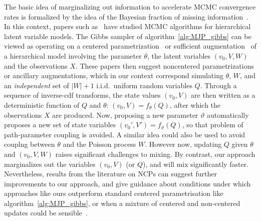 The basic idea of marginalizing out information to accelerate MCMC convergence rates is formalized by the idea of the Bayesian fraction of missing information~\citep{liu1994fraction}. 
In this context, papers such as~\citet{papaspiliopoulos2007general,yu2011center} have studied MCMC algorithms for hierarchical latent variable models. 
The Gibbs sampler of algorithm~\ref{alg:MJP_gibbs} can be viewed as operating on a centered parametrization~\citep{papaspiliopoulos2007general} or sufficient augmentation~\citep{yu2011center} of a hierarchical model involving the parameter $\theta$, the latent variables $(v_0, V, W)$ and the observations $X$. 
These papers then suggest noncentered parametrizations or ancillary augmentations, which in our context correspond simulating $\theta$, $W$, and an {\em independent} set of $|W|+1$ i.i.d.\ uniform random variables $Q$. 
Through a sequence of inverse-cdf transforms, the state values $(v_0,V)$ are then written as a deterministic function of $Q$ and $\theta$: $(v_0,V) = f_\theta(Q)$, after which the observations $X$ are produced. 
Now, proposing a new parameter $\vartheta$ automatically proposes a new set of state variables $(v_0',V') = f_\vartheta(Q)$, so that problem of path-parameter coupling is avoided.
A similar idea could also be used to avoid couplng between $\theta$ and the Poisson process $W$.
However now, updating $Q$ given $\theta$ and $(v_0, V, W)$ raises significant challenges to mixing.
By contrast, our approach marginalizes out the variables $(v_0,V)$ (or $Q$), and will mix significantly faster.
Nevertheless, results from the literature on NCPs can suggest further improvements to our approach, and give guidance about conditions under which 
approaches like ours outperform standard centered parametrisation like algorithm~\ref{alg:MJP_gibbs}, or when a mixture of centered and non-centered
updates could be sensible~\citep{yu2011center}.


